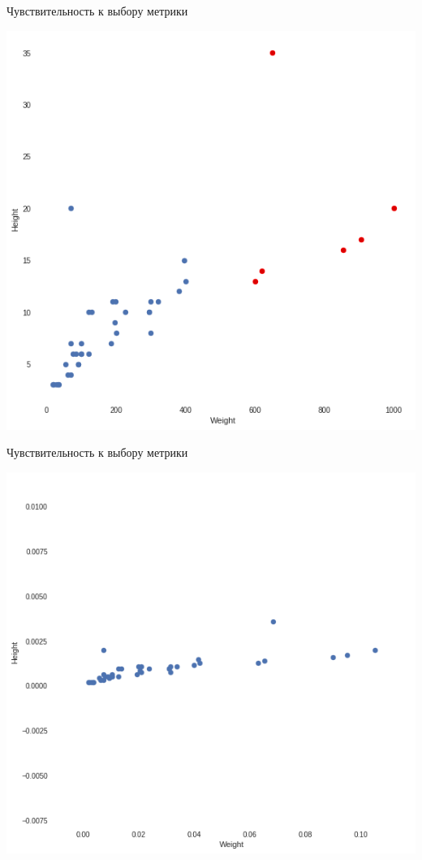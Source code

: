 \documentclass[10pt]{beamer}
\begin{document}
\begin{frame}{Чувствительность к выбору метрики}
	\begin{center}
	  \includegraphics[height=0.8 \textheight, keepaspectratio = true]{images/weight_height2}  
	\end{center}
\end{frame}

\begin{frame}{Чувствительность к выбору метрики}
	\begin{center}
	  \includegraphics[height=0.8 \textheight, keepaspectratio = true]{images/weight_height3}  
	\end{center}
\end{frame}
\end{document}
